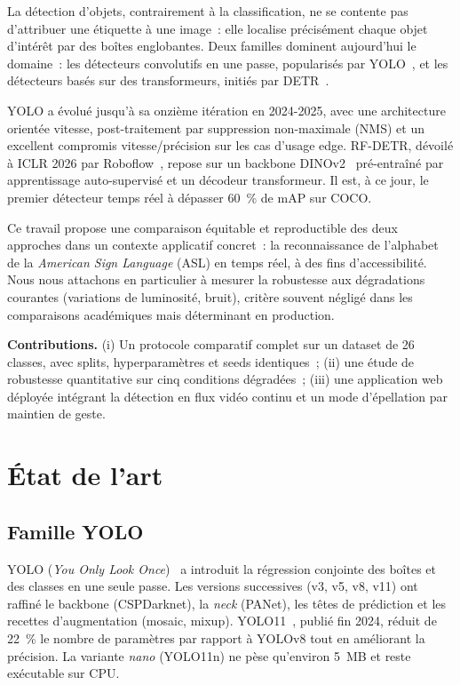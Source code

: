 \documentclass[conference]{IEEEtran}
\begin{document}
La détection d'objets, contrairement à la classification, ne se contente pas d'attribuer une étiquette à une image~: elle localise précisément chaque objet d'intérêt par des boîtes englobantes. Deux familles dominent aujourd'hui le domaine~: les détecteurs convolutifs en une passe, popularisés par YOLO~\cite{redmon2016yolo}, et les détecteurs basés sur des transformeurs, initiés par DETR~\cite{carion2020detr}.

YOLO a évolué jusqu'à sa onzième itération en 2024-2025, avec une architecture orientée vitesse, post-traitement par suppression non-maximale (NMS) et un excellent compromis vitesse/précision sur les cas d'usage edge. RF-DETR, dévoilé à ICLR 2026 par Roboflow~\cite{rfdetr2026}, repose sur un backbone DINOv2~\cite{oquab2023dinov2} pré-entraîné par apprentissage auto-supervisé et un décodeur transformeur. Il est, à ce jour, le premier détecteur temps réel à dépasser \SI{60}{\percent} de mAP sur COCO.

Ce travail propose une comparaison équitable et reproductible des deux approches dans un contexte applicatif concret~: la reconnaissance de l'alphabet de la \textit{American Sign Language} (ASL) en temps réel, à des fins d'accessibilité. Nous nous attachons en particulier à mesurer la robustesse aux dégradations courantes (variations de luminosité, bruit), critère souvent négligé dans les comparaisons académiques mais déterminant en production.

\textbf{Contributions.} (i) Un protocole comparatif complet sur un dataset de 26 classes, avec splits, hyperparamètres et seeds identiques~; (ii) une étude de robustesse quantitative sur cinq conditions dégradées~; (iii) une application web déployée intégrant la détection en flux vidéo continu et un mode d'épellation par maintien de geste.

\section{État de l'art}

\subsection{Famille YOLO}

YOLO (\textit{You Only Look Once})~\cite{redmon2016yolo} a introduit la régression conjointe des boîtes et des classes en une seule passe. Les versions successives (v3, v5, v8, v11) ont raffiné le backbone (CSPDarknet), la \textit{neck} (PANet), les têtes de prédiction et les recettes d'augmentation (mosaic, mixup). YOLO11~\cite{ultralytics2024yolo11}, publié fin 2024, réduit de \SI{22}{\percent} le nombre de paramètres par rapport à YOLOv8 tout en améliorant la précision. La variante \textit{nano} (YOLO11n) ne pèse qu'environ \SI{5}{MB} et reste exécutable sur CPU.
\end{document}
